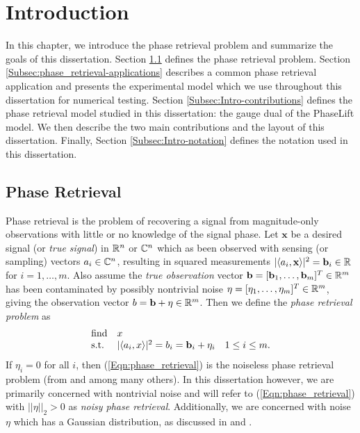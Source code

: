 \chapter{Introduction}  \label{Sec:Intro}


In this chapter, we introduce the phase retrieval problem and summarize the goals of this dissertation.
Section \ref{Subsec:phase_retrieval-math_model} defines the phase retrieval problem.
Section \ref{Subsec:phase_retrieval-applications} describes a common phase retrieval application and presents the experimental model which we use throughout this dissertation for numerical testing.
Section \ref{Subsec:Intro-contributions} defines the phase retrieval model studied in this dissertation: the gauge dual of the PhaseLift model.
We then describe the two main contributions and the layout of this dissertation.
Finally, Section \ref{Subsec:Intro-notation} defines the notation used in this dissertation.



\section{Phase Retrieval}	\label{Subsec:phase_retrieval-math_model}



Phase retrieval is the problem of recovering a signal from magnitude-only observations with little or no knowledge of the signal phase.  
Let $\mathbf{x}$ be a desired signal (or \textit{true signal}) in ${\mathbb R}^n$ or ${\mathbb C}^n$ which as been observed with sensing (or sampling) vectors $a_i \in {\mathbb C}^n$, resulting in squared measurements $|\langle a_i, \mathbf{x} \rangle |^2 = \mathbf{b}_i \in {\mathbb R}$ for $i = 1, \ldots, m$.  
Also assume the \textit{true observation} vector $\mathbf{b} = [\mathbf{b}_1, \ldots, \mathbf{b}_m]^T \in {\mathbb R}^m$ has been contaminated by possibly nontrivial noise $\eta = [\eta_1, \ldots, \eta_m]^T \in {\mathbb R}^m$, giving the observation vector $b = \mathbf{b} + \eta \in {\mathbb R}^m$.  Then we define the \textit{phase retrieval problem} as
\begin{equation} \label{Eqn:phase_retrieval}
\begin{array}{lll}
\textnormal{find}		&	x		\\
\textnormal{s.t.}				&	|\langle a_i, x \rangle|^2 = b_i = \mathbf{b}_i + \eta_i	&	1 \leq i \leq m.
\end{array}
\end{equation}
If $\eta_i = 0$ for all $i$, then (\ref{Eqn:phase_retrieval}) is the noiseless phase retrieval problem (from \cite{Fienup82} and  \cite{DBLP:journals/tit/CandesLS15} among many others).  In this dissertation however, we are primarily concerned with nontrivial noise and will refer to (\ref{Eqn:phase_retrieval}) with $||\eta||_2 > 0$ as \textit{noisy phase retrieval}.  Additionally, we are concerned with noise $\eta$ which has a Gaussian distribution, as discussed in \cite{DBLP:journals/siamis/CandesESV13} and \cite{DBLP:journals/siamsc/FriedlanderM16}.


